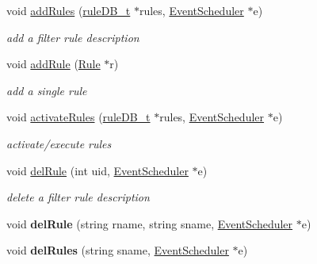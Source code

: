 \begin{DoxyCompactItemize}
void \hyperlink{classRuleManager_ae1d3a7b7e4ccf47a992e8239d3f643a4}{add\+Rules} (\hyperlink{RuleFileParser_8h_a7d5bb94bb17a8a1d92db2a89a0cc96d1}{rule\+D\+B\+\_\+t} $\ast$rules, \hyperlink{classEventScheduler}{Event\+Scheduler} $\ast$e)
\begin{DoxyCompactList}\small\item\em add a filter rule description \end{DoxyCompactList}\item 
\mbox{\label{classRuleManager_a40a2dd1e2f15f37c2237079b431bccd8}} 
void \hyperlink{classRuleManager_a40a2dd1e2f15f37c2237079b431bccd8}{add\+Rule} (\hyperlink{classRule}{Rule} $\ast$r)
\begin{DoxyCompactList}\small\item\em add a single rule \end{DoxyCompactList}\item 
\mbox{\label{classRuleManager_a7318810cdd95a602ce890afe2b603320}} 
void \hyperlink{classRuleManager_a7318810cdd95a602ce890afe2b603320}{activate\+Rules} (\hyperlink{RuleFileParser_8h_a7d5bb94bb17a8a1d92db2a89a0cc96d1}{rule\+D\+B\+\_\+t} $\ast$rules, \hyperlink{classEventScheduler}{Event\+Scheduler} $\ast$e)
\begin{DoxyCompactList}\small\item\em activate/execute rules \end{DoxyCompactList}\item 
void \hyperlink{classRuleManager_ab01b6ffe72edce8b9d8b8d3ff5baf55b}{del\+Rule} (int uid, \hyperlink{classEventScheduler}{Event\+Scheduler} $\ast$e)
\begin{DoxyCompactList}\small\item\em delete a filter rule description \end{DoxyCompactList}\item 
\mbox{\label{classRuleManager_ac1b0013d3bb1d153ff5eaee4974ea275}} 
void {\bfseries del\+Rule} (string rname, string sname, \hyperlink{classEventScheduler}{Event\+Scheduler} $\ast$e)
\item 
\mbox{\label{classRuleManager_aee617ae038c13cd8a0aa292b6a16c325}} 
void {\bfseries del\+Rules} (string sname, \hyperlink{classEventScheduler}{Event\+Scheduler} $\ast$e)
\item 
\mbox{\label{classRuleManager_aebb5b47bca52719f5741039002d7a9f8}} 

\end{DoxyCompactItemize}

